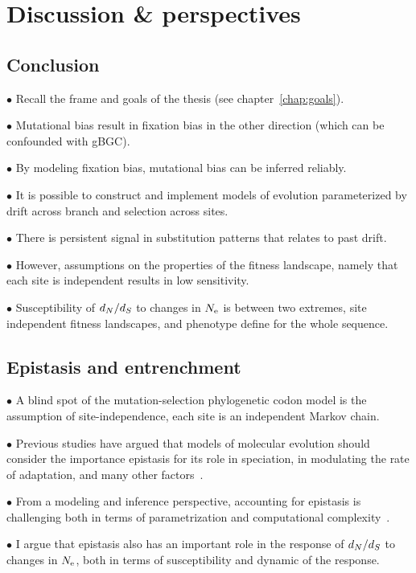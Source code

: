 \chapter{Discussion \& perspectives}
{
\hypersetup{linkcolor=GREYDARK}
\minitoc
}

\section{Conclusion}

$\bullet$ Recall the frame and goals of the thesis (see chapter~\ref{chap:goals}).

$\bullet$ Mutational bias result in fixation bias in the other direction (which can be confounded with gBGC).

$\bullet$ By modeling fixation bias, mutational bias can be inferred reliably.

$\bullet$ It is possible to construct and implement models of evolution parameterized by drift across branch and selection across sites.

$\bullet$ There is persistent signal in substitution patterns that relates to past drift.

$\bullet$ However, assumptions on the properties of the fitness landscape, namely that each site is independent results in low sensitivity.

$\bullet$ Susceptibility of $d_N / d_S$ to changes in $N_{\textrm{e}}$ is between two extremes, site independent fitness landscapes, and phenotype define for the whole sequence.

\section{Epistasis and entrenchment}

$\bullet$ A blind spot of the mutation-selection phylogenetic codon model is the assumption of site-independence, each site is an independent Markov chain.

$\bullet$ Previous studies have argued that models of molecular evolution should consider the importance epistasis for its role in speciation, in modulating the rate of adaptation, and many other factors~\citep{Goldstein2017, Miller2018}.

$\bullet$ From a modeling and inference perspective, accounting for epistasis is challenging both in terms of parametrization and computational complexity~\citep{Rodrigue2005, Manhart2014}.

$\bullet$ I argue that epistasis also has an important role in the response of $d_N / d_S$ to changes in $N_{\textrm{e}}$, both in terms of susceptibility and dynamic of the response.

